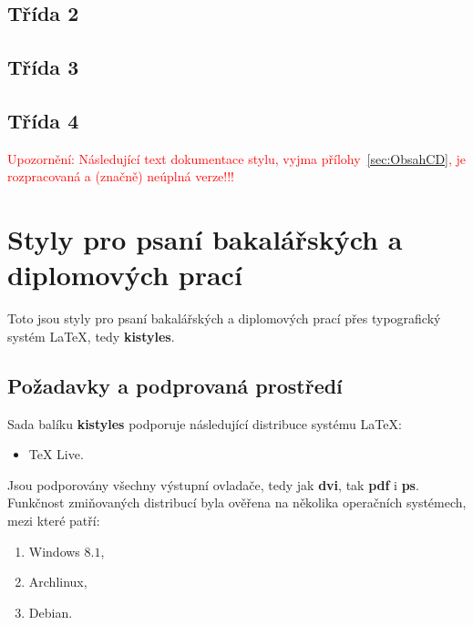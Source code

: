 \documentclass[
  biblatex,
  glossaries,
  index
]{kidiplom}
\begin{document}
\subsection{Třída 2}
\subsection{Třída 3}
\subsection{Třída 4}




































\noindent\textcolor{red}{\LARGE Upozornění: Následující text
  dokumentace stylu, vyjma přílohy~\ref{sec:ObsahCD}, je rozpracovaná
  a (značně) neúplná verze!!!}

\section{Styly pro psaní bakalářských a diplomových prací}
Toto jsou styly pro psaní bakalářských a diplomových prací přes typografický systém \LaTeX{}, tedy \textbf{kistyles}.

\subsection{Požadavky a podprovaná prostředí}
Sada balíku \textbf{kistyles} podporuje následující distribuce systému \LaTeX{}:
\begin{itemize}
\item \TeX{} Live.
\end{itemize}

Jsou podporovány všechny výstupní ovladače, tedy jak \textbf{dvi}, tak \textbf{pdf} i \textbf{ps}. Funkčnost zmiňovaných distribucí byla ověřena na několika operačních systémech, mezi které patří:
\begin{enumerate}
\item Windows $8.1$,
\item Archlinux,
\item Debian.
\end{enumerate}
\end{document}
